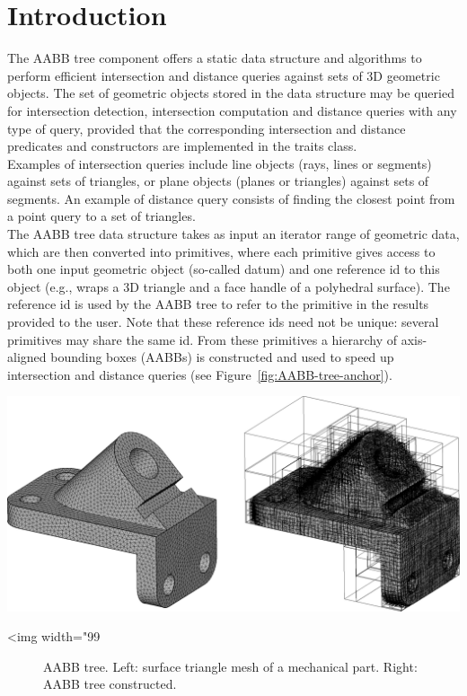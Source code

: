 \section{Introduction}
\label{AABB_tree_section_intro}

The AABB tree component offers a static data structure and algorithms to perform efficient intersection and distance queries against sets of 3D geometric objects.
The set of geometric objects stored in the data structure may be queried for intersection detection, intersection computation and distance queries with any type of query, provided that the corresponding intersection and distance predicates and constructors are implemented in the traits class.\\

Examples of intersection queries include line objects (rays, lines or segments) against sets of triangles, or plane objects (planes or triangles) against sets of segments. An example of distance query consists of finding the closest point from a point query to a set of triangles.\\

The AABB tree data structure takes as input an iterator range of geometric data, which are then converted into primitives, where each primitive gives access to both one input geometric object (so-called datum) and one reference id to this object (e.g., wraps a 3D triangle and a face handle of a polyhedral surface). The reference id is used by the AABB tree to refer to the primitive in the results provided to the user. Note that these reference ids need not be unique: several primitives may share the same id. From these primitives a hierarchy of axis-aligned bounding boxes (AABBs) is constructed and used to speed up intersection and distance queries (see Figure~\ref{fig:AABB-tree-anchor}). 

\begin{center}
    \label{fig:AABB-tree-anchor}
    \begin{ccTexOnly}
      \includegraphics[width=1.0\textwidth]{AABB_tree/anchor}
    \end{ccTexOnly}
    \begin{ccHtmlOnly}
        <img width="99%
    \end{ccHtmlOnly}
    \begin{figure}[h]
        \caption{AABB tree.
                 Left: surface triangle mesh of a mechanical part.
                 Right: AABB tree constructed.}
    \end{figure}
\end{center}
